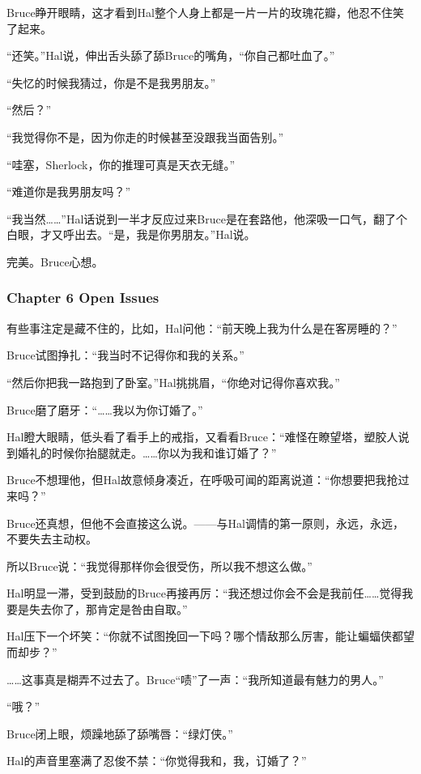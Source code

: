 \documentclass[../main.tex]{subfiles}
\begin{document}
Bruce睁开眼睛，这才看到Hal整个人身上都是一片一片的玫瑰花瓣，他忍不住笑了起来。

“还笑。”Hal说，伸出舌头舔了舔Bruce的嘴角，“你自己都吐血了。”

“失忆的时候我猜过，你是不是我男朋友。”

“然后？”

“我觉得你不是，因为你走的时候甚至没跟我当面告别。”

“哇塞，Sherlock，你的推理可真是天衣无缝。”

“难道你是我男朋友吗？”

“我当然\ldots\ldots”Hal话说到一半才反应过来Bruce是在套路他，他深吸一口气，翻了个白眼，才又呼出去。“是，我是你男朋友。”Hal说。

完美。Bruce心想。

\hypertarget{chapter-6-open-issues}{%
  \subsubsection{Chapter 6 Open Issues}\label{chapter-6-open-issues}}

有些事注定是藏不住的，比如，Hal问他：“前天晚上我为什么是在客房睡的？”

Bruce试图挣扎：“我当时不记得你和我的关系。”

“然后你把我一路抱到了卧室。”Hal挑挑眉，“你绝对记得你喜欢我。”

Bruce磨了磨牙：“\ldots\ldots 我以为你订婚了。”

Hal瞪大眼睛，低头看了看手上的戒指，又看看Bruce：“难怪在瞭望塔，塑胶人说到婚礼的时候你抬腿就走。\ldots\ldots 你以为我和谁订婚了？”

Bruce不想理他，但Hal故意倾身凑近，在呼吸可闻的距离说道：“你想要把我抢过来吗？”

Bruce还真想，但他不会直接这么说。——与Hal调情的第一原则，永远，永远，不要失去主动权。

所以Bruce说：“我觉得那样你会很受伤，所以我不想这么做。”

Hal明显一滞，受到鼓励的Bruce再接再厉：“我还想过你会不会是我前任\ldots\ldots 觉得我要是失去你了，那肯定是咎由自取。”

Hal压下一个坏笑：“你就不试图挽回一下吗？哪个情敌那么厉害，能让蝙蝠侠都望而却步？”

\ldots\ldots 这事真是糊弄不过去了。Bruce“啧”了一声：“我所知道最有魅力的男人。”

“哦？”

Bruce闭上眼，烦躁地舔了舔嘴唇：“绿灯侠。”

Hal的声音里塞满了忍俊不禁：“你觉得我和，我，订婚了？”
\end{document}
